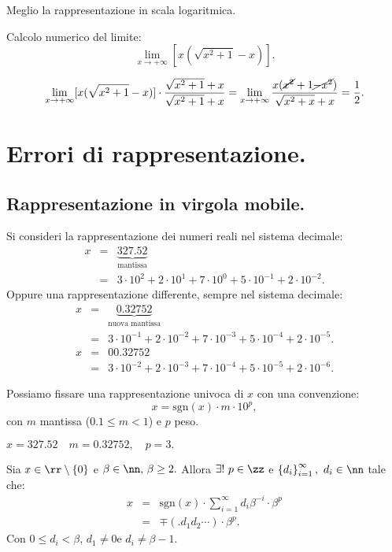 
Meglio la rappresentazione in scala logaritmica.


\begin{ese}
Calcolo numerico del limite: 
\[\lim_{x \to +\infty}[x(\sqrt{x^2+1}-x)].\]



\[
\lim_{x \to +\infty}[x(\sqrt{x^2+1}-x)] \cdot 
\frac{\sqrt{x^2+1}+x}{\sqrt{x^2+1}+x}
= \lim_{x \to +\infty}\frac{x (\cancel{x^2} + 1 \cancel{- x^2})}{\sqrt{x^2+x}+x}
= \frac{1}{2}.
\]
\end{ese}


\section{Errori di rappresentazione.}
\subsection{Rappresentazione in virgola mobile.}
Si consideri la rappresentazione dei numeri reali nel sistema decimale:
\[
\begin{array}{lcl}
x & = & \underbrace{327.52}_{\textrm{mantissa}}\\
  & = & 3\cdot 10^2 + 2\cdot 10^1 + 7\cdot 10^0 + 5\cdot 10^{-1} + 2\cdot 
10^{-2}.
\end{array}
\]
Oppure una rappresentazione differente, sempre nel sistema decimale:
\[
\begin{array}{lcl}
x & = & \underbrace{0.32752}_{\textrm{nuova mantissa}}\\
  & = & 3\cdot 10^{-1} + 2\cdot 10^{-2} + 7\cdot 10^{-3} + 5\cdot 10^{-4} + 2
\cdot 
10^{-5}.
\end{array}
\]
\[
\begin{array}{lcl}
x & = & 00.32752 \\
  & = & 3\cdot 10^{-2} + 2\cdot 10^{-3} + 7\cdot 10^{-4} + 5\cdot 10^{-5} + 2
\cdot 
10^{-6}.
\end{array}
\]

Possiamo fissare una rappresentazione univoca di $x$ con una convenzione:
\[x = \textrm{sgn}(x)\cdot m \cdot 10^p,\]
con $m$ mantissa ($0.1 \leq m < 1$) e $p$ peso.
\begin{exe}
$x = 327.52 \quad m = 0.32752, \quad p = 3.$
\end{exe}

\begin{teo}
Sia $x \in \rr\setminus\{0\}$ e $\beta \in \nn, \, \beta \geq 2.$ Allora
$\exists ! \ p \in \zz$ e $\left\{d_i\right\}_{i = 1}^{\infty}, \ d_i \in \nn$
tale che:
\[
\begin{array}{lcl}
x & = & \mathrm{sgn}(x) \cdot \sum_{i = 1}^{\infty}d_i \beta^{-i} \cdot \beta^p \\
  & = & \mp(.d_1d_2\cdots)\cdot \beta^p.
\end{array}
\]
Con $ 0 \leq d_i < \beta$, $d_1 \neq 0$e $d_i \neq \beta -1$.
\end{teo}

